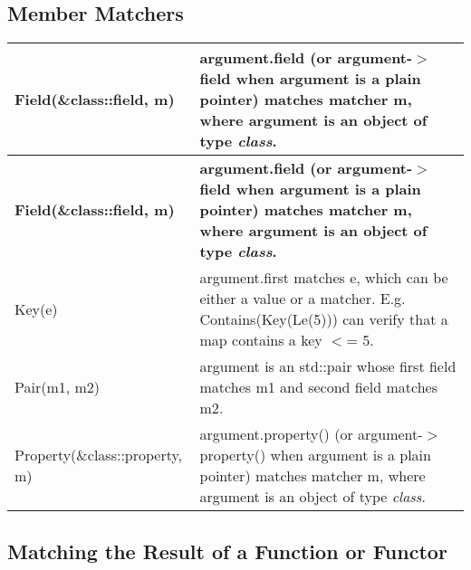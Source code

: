 \begin{DoxyCode}{0}
\DoxyCodeLine{\}}
\end{DoxyCode}


\subsection*{Member Matchers}

\tabulinesep=1mm
\begin{longtabu}spread 0pt [c]{*{2}{|X[-1]}|}
\hline
\cellcolor{\tableheadbgcolor}\textbf{ {\ttfamily Field(\&class\+::field, m)}  }&\cellcolor{\tableheadbgcolor}\textbf{ {\ttfamily argument.\+field} (or {\ttfamily argument-\/$>$field} when {\ttfamily argument} is a plain pointer) matches matcher {\ttfamily m}, where {\ttfamily argument} is an object of type {\itshape class}.   }\\
\endfirsthead
\hline
\endfoot
\hline
\cellcolor{\tableheadbgcolor}\textbf{ {\ttfamily Field(\&class\+::field, m)}  }&\cellcolor{\tableheadbgcolor}\textbf{ {\ttfamily argument.\+field} (or {\ttfamily argument-\/$>$field} when {\ttfamily argument} is a plain pointer) matches matcher {\ttfamily m}, where {\ttfamily argument} is an object of type {\itshape class}.   }\\
\endhead
{\ttfamily Key(e)}  &{\ttfamily argument.\+first} matches {\ttfamily e}, which can be either a value or a matcher. E.\+g. {\ttfamily Contains(Key(\+Le(5)))} can verify that a {\ttfamily map} contains a key {\ttfamily $<$= 5}.   \\
{\ttfamily Pair(m1, m2)}  &{\ttfamily argument} is an {\ttfamily std\+::pair} whose {\ttfamily first} field matches {\ttfamily m1} and {\ttfamily second} field matches {\ttfamily m2}.   \\
{\ttfamily Property(\&class\+::property, m)}  &{\ttfamily argument.\+property()} (or {\ttfamily argument-\/$>$property()} when {\ttfamily argument} is a plain pointer) matches matcher {\ttfamily m}, where {\ttfamily argument} is an object of type {\itshape class}.   \\
\end{longtabu}


\subsection*{Matching the Result of a Function or Functor}

